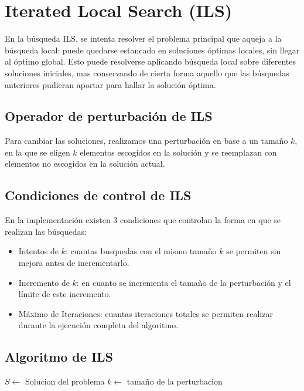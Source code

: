 \documentclass{ci5652}
\begin{document}
\section{Iterated Local Search (ILS)}
En la búsqueda ILS, se intenta resolver el problema principal que aqueja a la búsqueda local: puede quedarse estancado en soluciones óptimas locales, sin llegar al óptimo global. Esto puede resolverse aplicando búsqueda local sobre diferentes soluciones iniciales, mas conservando de cierta forma aquello que las búsquedas anteriores pudieran aportar para hallar la solución óptima.

\subsection{Operador de perturbación de ILS}
Para cambiar las soluciones, realizamos una perturbación en base a un tamaño $k$, en la que se eligen $k$ elementos escogidos en la solución y se reemplazan con elementos no escogidos en la solución actual.

\subsection{Condiciones de control de ILS}
En la implementación existen 3 condiciones que controlan la forma en que se realizan las búsquedas:
\begin{itemize} \itemsep5pt
	\item Intentos de $k$: cuantas busquedas con el mismo tamaño $k$ se permiten sin mejora antes de incrementarlo.
	\item Incremento de $k$: en cuanto se incrementa el tamaño de la perturbación y el límite de este incremento.
	\item Máximo de Iteraciones: cuantas iteraciones totales se permiten realizar durante la ejecución completa del algoritmo.
\end{itemize}

\subsection{Algoritmo de ILS}
\begin{algorithm}[h!]
\DontPrintSemicolon
$S \leftarrow$ Solucion del problema\;
$k \leftarrow$ tamaño de la perturbacion\;
\end{algorithm}
\end{document}
